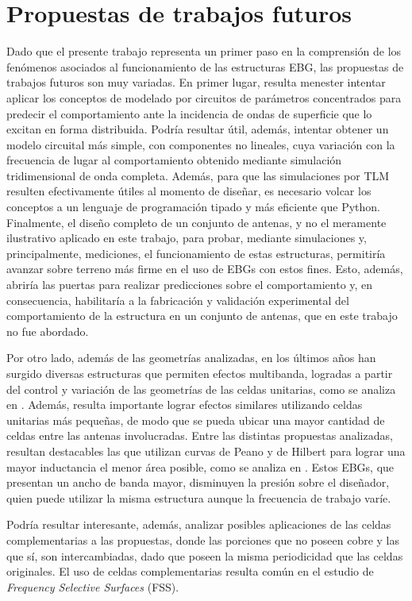 \section{Propuestas de trabajos futuros}

Dado que el presente trabajo representa un primer paso en la comprensión de los fenómenos asociados al funcionamiento de las estructuras EBG, las propuestas de trabajos futuros son muy variadas. En primer lugar, resulta menester intentar aplicar los conceptos de modelado por circuitos de parámetros concentrados para predecir el comportamiento ante la incidencia de ondas de superficie que lo excitan en forma distribuida. Podría resultar útil, además, intentar obtener un modelo circuital más simple, con componentes no lineales, cuya variación con la frecuencia de lugar al comportamiento obtenido mediante simulación tridimensional de onda completa. Además, para que las simulaciones por TLM resulten efectivamente útiles al momento de diseñar, es necesario volcar los conceptos a un lenguaje de programación tipado y más eficiente que Python. Finalmente, el diseño completo de un conjunto de antenas, y no el meramente ilustrativo aplicado en este trabajo, para probar, mediante simulaciones y, principalmente, mediciones, el funcionamiento de estas estructuras, permitiría avanzar sobre terreno más firme en el uso de EBGs con estos fines. Esto, además, abriría las puertas para realizar predicciones sobre el comportamiento y, en consecuencia, habilitaría a la fabricación y validación experimental del comportamiento de la estructura en un conjunto de antenas, que en este trabajo no fue abordado.

Por otro lado, además de las geometrías analizadas, en los últimos años han surgido diversas estructuras que permiten efectos multibanda, logradas a partir del control y variación de las geometrías de las celdas unitarias, como se analiza en \cite{Kern:multiband}. Además, resulta importante lograr efectos similares utilizando celdas unitarias más pequeñas, de modo que se pueda ubicar una mayor cantidad de celdas entre las antenas involucradas. Entre las distintas propuestas analizadas, resultan destacables las que utilizan curvas de Peano y de Hilbert para lograr una mayor inductancia el menor área posible, como se analiza en \cite{McVay:Peano}. Estos EBGs, que presentan un ancho de banda mayor, disminuyen la presión sobre el diseñador, quien puede utilizar la misma estructura aunque la frecuencia de trabajo varíe.

Podría resultar interesante, además, analizar posibles aplicaciones de las celdas complementarias a las propuestas, donde las porciones que no poseen cobre y las que sí, son intercambiadas, dado que poseen la misma periodicidad que las celdas originales. El uso de celdas complementarias resulta común en el estudio de \textit{Frequency Selective Surfaces} (FSS).

